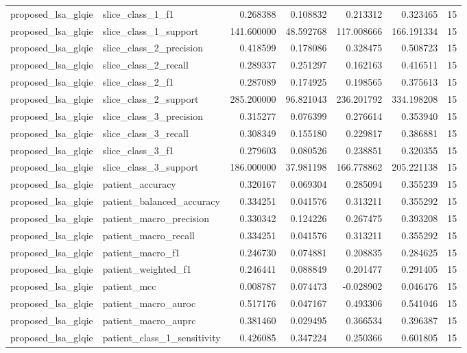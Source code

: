 \begin{tabular}{llrrrrr}
proposed_lsa_glqie & slice_class_1_f1 & 0.268388 & 0.108832 & 0.213312 & 0.323465 & 15 \\
proposed_lsa_glqie & slice_class_1_support & 141.600000 & 48.592768 & 117.008666 & 166.191334 & 15 \\
proposed_lsa_glqie & slice_class_2_precision & 0.418599 & 0.178086 & 0.328475 & 0.508723 & 15 \\
proposed_lsa_glqie & slice_class_2_recall & 0.289337 & 0.251297 & 0.162163 & 0.416511 & 15 \\
proposed_lsa_glqie & slice_class_2_f1 & 0.287089 & 0.174925 & 0.198565 & 0.375613 & 15 \\
proposed_lsa_glqie & slice_class_2_support & 285.200000 & 96.821043 & 236.201792 & 334.198208 & 15 \\
proposed_lsa_glqie & slice_class_3_precision & 0.315277 & 0.076399 & 0.276614 & 0.353940 & 15 \\
proposed_lsa_glqie & slice_class_3_recall & 0.308349 & 0.155180 & 0.229817 & 0.386881 & 15 \\
proposed_lsa_glqie & slice_class_3_f1 & 0.279603 & 0.080526 & 0.238851 & 0.320355 & 15 \\
proposed_lsa_glqie & slice_class_3_support & 186.000000 & 37.981198 & 166.778862 & 205.221138 & 15 \\
proposed_lsa_glqie & patient_accuracy & 0.320167 & 0.069304 & 0.285094 & 0.355239 & 15 \\
proposed_lsa_glqie & patient_balanced_accuracy & 0.334251 & 0.041576 & 0.313211 & 0.355292 & 15 \\
proposed_lsa_glqie & patient_macro_precision & 0.330342 & 0.124226 & 0.267475 & 0.393208 & 15 \\
proposed_lsa_glqie & patient_macro_recall & 0.334251 & 0.041576 & 0.313211 & 0.355292 & 15 \\
proposed_lsa_glqie & patient_macro_f1 & 0.246730 & 0.074881 & 0.208835 & 0.284625 & 15 \\
proposed_lsa_glqie & patient_weighted_f1 & 0.246441 & 0.088849 & 0.201477 & 0.291405 & 15 \\
proposed_lsa_glqie & patient_mcc & 0.008787 & 0.074473 & -0.028902 & 0.046476 & 15 \\
proposed_lsa_glqie & patient_macro_auroc & 0.517176 & 0.047167 & 0.493306 & 0.541046 & 15 \\
proposed_lsa_glqie & patient_macro_auprc & 0.381460 & 0.029495 & 0.366534 & 0.396387 & 15 \\
proposed_lsa_glqie & patient_class_1_sensitivity & 0.426085 & 0.347224 & 0.250366 & 0.601805 & 15 \\

\end{tabular}
